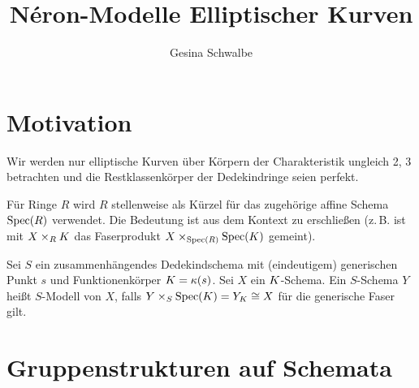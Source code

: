 \documentclass[german]{scrreprt}
\title{
  Néron-Modelle Elliptischer Kurven 
}
\author{Gesina Schwalbe}
\begin{document}
\maketitle
\tableofcontents

\chapter{Motivation}
Wir werden nur elliptische Kurven über Körpern der Charakteristik
ungleich 2, 3 betrachten und die Restklassenkörper der Dedekindringe
seien perfekt.

Für Ringe $R$ wird $R$ stellenweise als Kürzel für das zugehörige
affine Schema $\operatorname{Spec}(R)$ verwendet. Die Bedeutung ist aus dem Kontext
zu erschließen (z.\,B. ist mit $X\times_R K$ das Faserprodukt
$X\times_{\operatorname{Spec}(R)}\operatorname{Spec}(K)$ gemeint).

\begin{Definition}[$S$-Modell]
  Sei $S$ ein zusammenhängendes Dedekindschema mit (eindeutigem)
  generischen Punkt $s$ und Funktionenkörper $K=\kappa(s)$.
  Sei $X$ ein $K$-Schema.
  Ein $S$-Schema $Y$ heißt $S$-Modell von $X$, falls
  $Y\times_S\operatorname{Spec}(K)=Y_K\cong X$ für die generische Faser gilt.
\end{Definition}


\chapter{Gruppenstrukturen auf Schemata}
\end{document}

